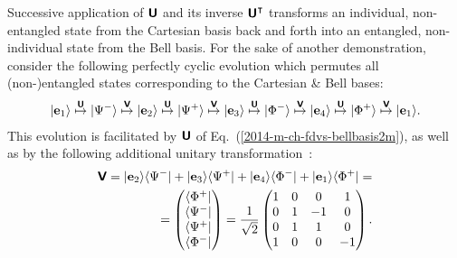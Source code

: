 Successive application of  $\textsf{\textbf{U}}$ and its inverse $\textsf{\textbf{U}}^\intercal$ transforms an individual,
non-entangled state from the Cartesian basis back and forth
into an entangled, non-individual state from the Bell basis.
For the sake of another demonstration,
consider the following perfectly cyclic evolution  which permutes all (non-)entangled  states
corresponding to the Cartesian \&  Bell bases:
\begin{equation}
\begin{split}
\vert {\bf e}_1 \rangle
\stackrel{\textsf{\textbf{U}}}{\mapsto}
\vert \Psi^- \rangle
\stackrel{\textsf{\textbf{V}}}{\mapsto}
\vert {\bf e}_2 \rangle
\stackrel{\textsf{\textbf{U}}}{\mapsto}
\vert \Psi^+ \rangle
\stackrel{\textsf{\textbf{V}}}{\mapsto}
\vert {\bf e}_3 \rangle
\stackrel{\textsf{\textbf{U}}}{\mapsto}
\vert \Phi^- \rangle
\stackrel{\textsf{\textbf{V}}}{\mapsto}
\vert {\bf e}_4 \rangle
\stackrel{\textsf{\textbf{U}}}{\mapsto}
\vert \Phi^+ \rangle
\stackrel{\textsf{\textbf{V}}}{\mapsto}
\vert {\bf e}_1 \rangle
.
\end{split}
\label{2017-m-pu-book-chapter-qm-baf}
\end{equation}
This evolution is facilitated by $\textsf{\textbf{U}}$
of Eq.~(\ref{2014-m-ch-fdvs-bellbasis2m}), as well as by the following additional unitary transformation~\cite{Schwinger.60}:
\begin{equation}
 \begin{split}
\textsf{\textbf{V}} =
\vert {\bf e}_2 \rangle \langle  \Psi^-  \vert  +
\vert {\bf e}_3 \rangle \langle  \Psi^+  \vert  +
\vert {\bf e}_4 \rangle \langle  \Phi^-  \vert  +
\vert {\bf e}_1 \rangle \langle  \Phi^+  \vert
=
\\
=
\begin{pmatrix}
 \langle \Phi^+ \vert \\
 \langle \Psi^- \vert \\
 \langle \Psi^+ \vert \\
 \langle \Phi^- \vert  \end{pmatrix}
=   \frac{1}{\sqrt{2}}
\begin{pmatrix}
1 & 0 &   0 &   1 \\
0 & 1 &   -1 &   0 \\
0& 1 &   1 &   0 \\
1 & 0 &  0 &  -1
 \end{pmatrix}
.
\end{split}
\label{2017-m-pu-book-chapter-qm-baf-uo}
\end{equation}

